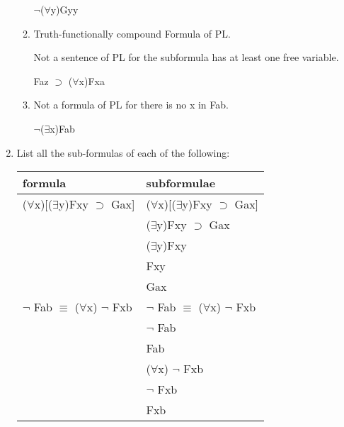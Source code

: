 \documentclass[12pt,letterpaper]{article}
\begin{document}
\begin{enumerate}
\begin{enumerate}
          \underline{$\neg$}($\forall$y)Gyy
        \item
          Truth-functionally compound Formula of PL.

          Not a sentence of PL for the subformula has at least one free variable.

          Faz \underline{$\supset$} ($\forall$x)Fxa
        \item
          Not a formula of PL for there is no x in Fab.

          $\neg$($\exists$x)Fab
      \end{enumerate}

    \item
      List all the sub-formulas of each of the following:

      \begin{tabular}{l l}
        formula & subformulae \\
        \hline
        ($\forall$x)[($\exists$y)Fxy $\supset$ Gax] & ($\forall$x)[($\exists$y)Fxy $\supset$ Gax] \\
        & ($\exists$y)Fxy $\supset$ Gax \\
        & ($\exists$y)Fxy \\
        & Fxy \\
        & Gax \\

        $\neg$ Fab $\equiv$ ($\forall$x) $\neg$ Fxb & $\neg$ Fab $\equiv$ ($\forall$x) $\neg$ Fxb \\
        & $\neg$ Fab \\
        & Fab \\
        & ($\forall$x) $\neg$ Fxb \\
        & $\neg$ Fxb \\
        & Fxb \\
      \end{tabular}
  \end{enumerate}
\end{document}
